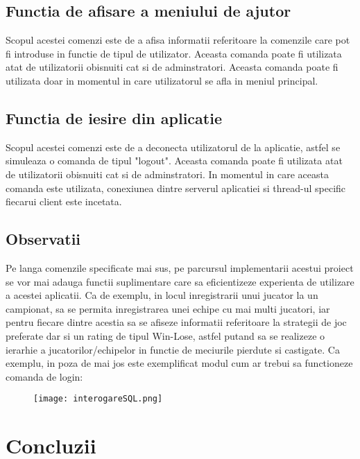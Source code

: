 \documentclass{article}
\begin{document}
\subsection{Functia de afisare a meniului de ajutor}

\quad Scopul acestei comenzi este de a afisa informatii referitoare la comenzile care pot fi introduse in functie de tipul de utilizator. Aceasta comanda poate fi utilizata atat de utilizatorii obisnuiti cat si de adminstratori. Aceasta comanda poate fi utilizata doar in momentul in care utilizatorul se afla in meniul principal.

\subsection{Functia de iesire din aplicatie}

\quad Scopul acestei comenzi este de a deconecta utilizatorul de la aplicatie, astfel se simuleaza o comanda de tipul "logout". Aceasta comanda poate fi utilizata atat de utilizatorii obisnuiti cat si de adminstratori. In momentul in care aceasta comanda este utilizata, conexiunea dintre serverul aplicatiei si thread-ul specific fiecarui client este incetata.





\subsection{Observatii}

\quad Pe langa comenzile specificate mai sus, pe parcursul implementarii acestui proiect se vor mai adauga functii suplimentare care sa eficientizeze experienta de utilizare a acestei aplicatii. Ca de exemplu, in locul inregistrarii unui jucator la un campionat, sa se permita inregistrarea unei echipe cu mai multi jucatori, iar pentru fiecare dintre acestia sa se afiseze informatii referitoare la strategii de joc preferate dar si un rating de tipul Win-Lose, astfel putand sa se realizeze o ierarhie a jucatorilor/echipelor in functie de meciurile pierdute si castigate.
\newpage
\quad Ca exemplu, in poza de mai jos este exemplificat modul cum ar trebui sa functioneze comanda de login: 
\begin{figure}[h]
\centering
\texttt{[image: interogareSQL.png]}
\end{figure}

\section{Concluzii}
\end{document}
